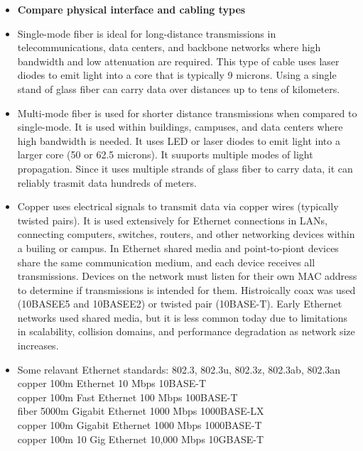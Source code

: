 \documentclass{article}
\begin{document}
\begin{itemize}
  \item \textbf{Compare physical interface and cabling types}
  	\item[] Single-mode fiber is ideal for long-distance transmissions in telecommunications, data centers, and backbone networks where high bandwidth and low attenuation are required. This type of cable uses laser diodes to emit light into a core that is typically 9 microns. Using a single stand of glass fiber can carry data over distances up to tens of kilometers.
	\item[] Multi-mode fiber is used for shorter distance transmissions when compared to single-mode. It is used within buildings, campuses, and data centers where high bandwidth is needed. It uses LED or laser diodes to emit light into a larger core (50 or 62.5 microns). It suuports multiple modes of light propagation. Since it uses multiple strands of glass fiber to carry data, it can reliably trasmit data hundreds of meters.
  	\item[] Copper uses electrical signals to transmit data via copper wires (typically twisted pairs). It is used extensively for Ethernet connections in LANs, connecting computers, switches, routers, and other networking devices within a builing or campus. In Ethernet shared media and point-to-piont devices share the same communication medium, and each device receives all transmissions. Devices on the network must listen for their own MAC address to determine if transmissions is intended for them. Histroically coax was used (10BASEE5 and 10BASEE2) or twisted pair (10BASE-T). Early Ethernet networks used shared media, but it is less common today due to limitations in scalability, collision domains, and performance degradation as network size increases.
  	\item[] Some relavant Ethernet standards: 802.3, 802.3u, 802.3z, 802.3ab, 802.3an\\
		copper 100m Ethernet 10 Mbps 10BASE-T\\
		copper 100m Fast Ethernet 100 Mbps 100BASE-T\\
		fiber 5000m Gigabit Ethernet 1000 Mbps 1000BASE-LX\\
		copper 100m Gigabit Ethernet 1000 Mbps 1000BASE-T\\
		copper 100m 10 Gig Ethernet 10,000 Mbps 10GBASE-T\\
  	

\end{itemize}
\end{document}

